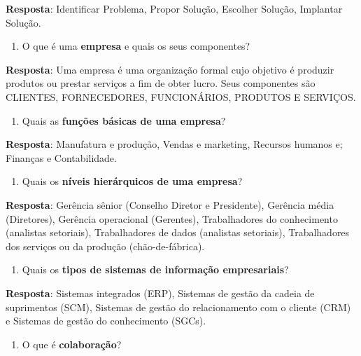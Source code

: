 \documentclass[
]{book}
\providecommand{\tightlist}{%
  \setlength{\itemsep}{0pt}\setlength{\parskip}{0pt}}
\begin{document}
\textbf{Resposta}: Identificar Problema, Propor Solução, Escolher Solução, Implantar Solução.

\begin{enumerate}
\def\labelenumi{\arabic{enumi}.}
\setcounter{enumi}{5}
\tightlist
\item
  O que é uma \textbf{empresa} e quais os seus componentes?
\end{enumerate}

\textbf{Resposta}: Uma empresa é uma organização formal cujo objetivo é produzir produtos ou prestar serviços a fim de obter lucro. Seus componentes são CLIENTES, FORNECEDORES, FUNCIONÁRIOS, PRODUTOS E SERVIÇOS.

\begin{enumerate}
\def\labelenumi{\arabic{enumi}.}
\setcounter{enumi}{6}
\tightlist
\item
  Quais as \textbf{funções básicas de uma empresa}?
\end{enumerate}

\textbf{Resposta}: Manufatura e produção, Vendas e marketing, Recursos humanos e; Finanças e Contabilidade.

\begin{enumerate}
\def\labelenumi{\arabic{enumi}.}
\setcounter{enumi}{8}
\tightlist
\item
  Quais os \textbf{níveis hierárquicos de uma empresa}?
\end{enumerate}

\textbf{Resposta}: Gerência sênior (Conselho Diretor e Presidente), Gerência média (Diretores), Gerência operacional (Gerentes), Trabalhadores do conhecimento (analistas setoriais), Trabalhadores de dados (analistas setoriais), Trabalhadores dos serviços ou da produção (chão-de-fábrica).

\begin{enumerate}
\def\labelenumi{\arabic{enumi}.}
\setcounter{enumi}{9}
\tightlist
\item
  Quais os \textbf{tipos de sistemas de informação empresariais}?
\end{enumerate}

\textbf{Resposta}: Sistemas integrados (ERP), Sistemas de gestão da cadeia de suprimentos (SCM), Sistemas de gestão do relacionamento com o cliente (CRM) e Sistemas de gestão do conhecimento (SGCs).

\begin{enumerate}
\def\labelenumi{\arabic{enumi}.}
\setcounter{enumi}{10}
\tightlist
\item
  O que é \textbf{colaboração}?
\end{enumerate}
\end{document}
